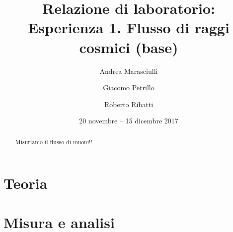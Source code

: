 \documentclass[a4paper]{article}
\title{Relazione di laboratorio:\\
Esperienza 1. Flusso di raggi cosmici (base)}
\author{Andrea Marasciulli
\and Giacomo Petrillo
\and Roberto Ribatti}
\date{20 novembre -- 15 dicembre 2017}
\begin{document}
\maketitle

\begin{abstract}
	Misuriamo il flusso di muoni!!
\end{abstract}

\tableofcontents



\section{Teoria}







\section{Misura e analisi}


















\end{document}
